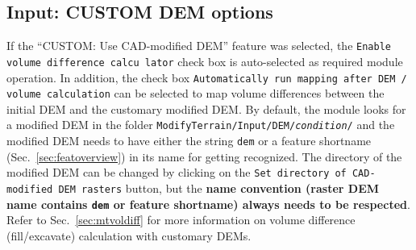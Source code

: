 \subsection{Input: CUSTOM DEM options}\label{sec:mtcustdem}
If the ``CUSTOM: Use CAD-modified DEM'' feature was selected, the \texttt{Enable volume difference calcu lator} check box is auto-selected as required module operation. In addition, the check box \texttt{Automatically run mapping after DEM / volume calculation} can be selected to map volume differences between the initial DEM and the customary modified DEM. By default, the module looks for a modified DEM in the folder \texttt{ModifyTerrain/Input/DEM/\textit{condition}/} and the modified DEM needs to have either the string \texttt{dem} or a feature shortname (Sec.~\ref{sec:featoverview}) in its name for getting recognized. The directory of the modified DEM can be changed by clicking on the \texttt{Set directory of CAD-modified DEM rasters} button, but the \textbf{name convention (raster DEM name contains \texttt{dem} or feature shortname) always needs to be respected}. Refer to Sec.~\ref{sec:mtvoldiff} for more information on volume difference (fill/excavate) calculation with customary DEMs.

